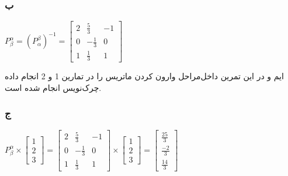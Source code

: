 \setRTL
\subsubsection*{ب}
\setLTR
$
P^\alpha_\beta = (P^\beta_{\alpha})^{-1} = 
\begin{bmatrix}
	2 & \frac{5}{3} & -1 \\
	0 & -\frac{1}{3} & 0 \\
	1 & \frac{1}{3} & 1
\end{bmatrix}
$
\setRTL

{\footnotesize مراحل وارون کردن ماتریس را در تمارین 1 و 2 انجام داده‌‎ایم و در این تمرین داخل چرک‌نویس انجام شده است.}


\subsubsection*{ج}
\setLTR
$
P_\beta^\alpha \times \begin{bmatrix}
	1 \\ 2 \\ 3
\end{bmatrix} =\begin{bmatrix}
2 & \frac{5}{3} & -1 \\
0 & -\frac{1}{3} & 0 \\
1 & \frac{1}{3} & 1
\end{bmatrix} \times \begin{bmatrix}
1 \\ 2 \\ 3
\end{bmatrix} = \begin{bmatrix}
\frac{25}{3} \\ \frac{-2}{3} \\ \frac{14}{3}
\end{bmatrix}
$
\setRTL